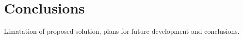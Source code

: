 \chapter{Conclusions}
Limatation of proposed solution, plans for future development and conclusions.